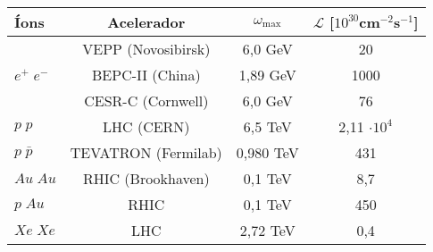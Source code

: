 \begin{tabular}{lccc}
	\hline
	Íons & Acelerador & $\omega _\text{max}$ & $\mathcal{L}$
		[$10^{30}$cm$^{-2}$s$^{-1}$]\\
	\hline
	\multirow{3}{4em}{$e^+ \; e^-$} & VEPP (Novosibirsk) & 6,0 GeV & 20
	\\
	& BEPC-II (China) & 1,89 GeV & 1000 \\
	& CESR-C (Cornwell) & 6,0 GeV & 76 \\
	$p \; p$ & LHC (CERN) & 6,5 TeV & 2,11 $\cdot 10^{4}$ \\
	$p \; \bar{p}$ & TEVATRON (Fermilab) & 0,980 TeV & 431 \\
	$Au \; Au$ & RHIC (Brookhaven) & 0,1 TeV & 8,7 \\
	$p \; Au$ & RHIC & 0,1 TeV & 450 \\
	$Xe \; Xe$ & LHC & 2,72 TeV & 0,4 \\
	\hline
\end{tabular}

